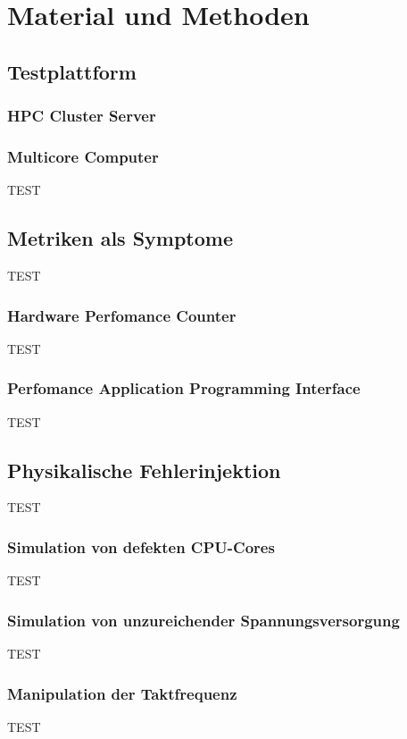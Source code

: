 \chapter{Material und Methoden}
\section{Testplattform}
\subsection{HPC Cluster Server}
\subsection{Multicore Computer}
TEST

\section{Metriken als Symptome}
TEST
\subsection{Hardware Perfomance Counter}

TEST

\subsection{Perfomance Application Programming Interface}

TEST


\section{Physikalische Fehlerinjektion}

TEST

\subsection{Simulation von defekten CPU-Cores}
TEST

\subsection{Simulation von unzureichender Spannungsversorgung}
TEST
\subsection{Manipulation der Taktfrequenz}
TEST

